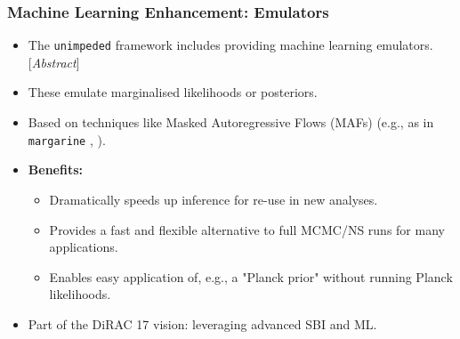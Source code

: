 \documentclass[aspectratio=169]{beamer}
\begin{document}
\begin{frame}
    \frametitle{Machine Learning Enhancement: Emulators}
        \begin{itemize}
            \item The \texttt{unimpeded} framework includes providing machine learning emulators. [\textit{Abstract}]
            \item These emulate marginalised likelihoods or posteriors.
            \item Based on techniques like Masked Autoregressive Flows (MAFs) (e.g., as in \texttt{margarine} , ).
            \item \textbf{Benefits:}
                \begin{itemize}
                    \item Dramatically speeds up inference for re-use in new analyses.
                    \item Provides a fast and flexible alternative to full MCMC/NS runs for many applications.
                    \item Enables easy application of, e.g., a "Planck prior" without running Planck likelihoods.
                \end{itemize}
            \item Part of the DiRAC 17 vision: leveraging advanced SBI and ML.
        \end{itemize}
\end{frame}
\end{document}
